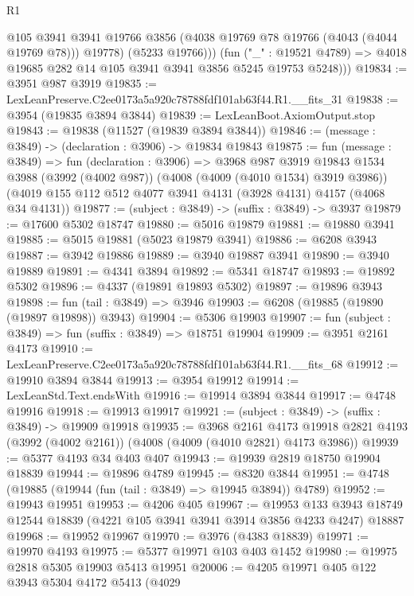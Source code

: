 \begin{lexlean}{R1}
\begin{coremodule}
              @105
              @3941
              @3941
              @19766
              @3856
              (@4038 @19769 @78 @19766 (@4043 (@4044 @19769 @78)))
              @19778)
            (@5233 @19766)))
        (fun ("_" : @19521 @4789) =>
        @4018 @19685 @282 @14 @105 @3941 @3941 @3856 @5245 @19753 @5248)))
@19834 := @3951 @987 @3919
@19835 := LexLeanPreserve.C2ee0173a5a920c78788fdf101ab63f44.R1.__fits_31
@19838 := @3954 (@19835 @3894 @3844)
@19839 := LexLeanBoot.AxiomOutput.stop
@19843 := @19838 (@11527 (@19839 @3894 @3844))
@19846 := (message : @3849) -> (declaration : @3906) -> @19834 @19843
@19875 := fun (message : @3849) =>
  fun (declaration : @3906) =>
  @3968
    @987
    @3919
    @19843
    @1534
    @3988
    (@3992 (@4002 @987))
    (@4008 (@4009 (@4010 @1534) @3919 @3986))
    (@4019 @155 @112 @512 @4077 @3941 @4131 (@3928 @4131) @4157 (@4068 @34 @4131))
@19877 := (subject : @3849) -> (suffix : @3849) -> @3937
@19879 := @17600 @5302 @18747
@19880 := @5016 @19879
@19881 := @19880 @3941
@19885 := @5015 @19881 (@5023 @19879 @3941)
@19886 := @6208 @3943
@19887 := @3942 @19886
@19889 := @3940 @19887 @3941
@19890 := @3940 @19889
@19891 := @4341 @3894
@19892 := @5341 @18747
@19893 := @19892 @5302
@19896 := @4337 (@19891 @19893 @5302)
@19897 := @19896 @3943
@19898 := fun (tail : @3849) => @3946
@19903 := @6208 (@19885 (@19890 (@19897 @19898)) @3943)
@19904 := @5306 @19903
@19907 := fun (subject : @3849) => fun (suffix : @3849) => @18751 @19904
@19909 := @3951 @2161 @4173
@19910 := LexLeanPreserve.C2ee0173a5a920c78788fdf101ab63f44.R1.__fits_68
@19912 := @19910 @3894 @3844
@19913 := @3954 @19912
@19914 := LexLeanStd.Text.endsWith
@19916 := @19914 @3894 @3844
@19917 := @4748 @19916
@19918 := @19913 @19917
@19921 := (subject : @3849) -> (suffix : @3849) -> @19909 @19918
@19935 := @3968
    @2161
    @4173
    @19918
    @2821
    @4193
    (@3992 (@4002 @2161))
    (@4008 (@4009 (@4010 @2821) @4173 @3986))
@19939 := @5377 @4193 @34 @403 @407
@19943 := @19939 @2819 @18750 @19904 @18839
@19944 := @19896 @4789
@19945 := @8320 @3844
@19951 := @4748 (@19885 (@19944 (fun (tail : @3849) => @19945 @3894)) @4789)
@19952 := @19943 @19951
@19953 := @4206 @405
@19967 := @19953
    @133
    @3943
    @18749
    @12544
    @18839
    (@4221 @105 @3941 @3941 @3914 @3856 @4233 @4247)
    @18887
@19968 := @19952 @19967
@19970 := @3976 (@4383 @18839)
@19971 := @19970 @4193
@19975 := @5377 @19971 @103 @403 @1452
@19980 := @19975 @2818 @5305 @19903 @5413 @19951
@20006 := @4205
    @19971
    @405
    @122
    @3943
    @5304
    @4172
    @5413
    (@4029

\end{coremodule}
\end{lexlean}
